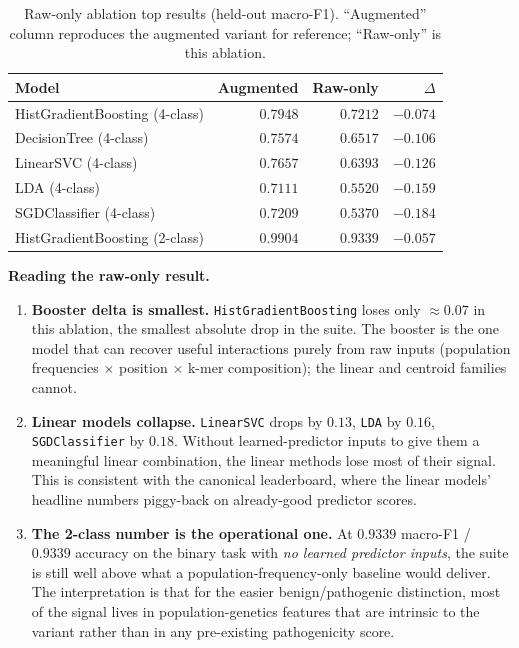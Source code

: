 \documentclass[11pt,a4paper]{article}
\begin{document}
\begin{table}[H]
\centering
\caption{Raw-only ablation top results (held-out macro-F1). ``Augmented''
column reproduces the augmented variant for reference; ``Raw-only'' is this
ablation.}
\label{tab:raw-only}
\small
\begin{tabular}{lrrr}
\toprule
Model & Augmented & Raw-only & $\Delta$ \\
\midrule
HistGradientBoosting (4-class) & $0.7948$ & $0.7212$ & $-0.074$ \\
DecisionTree (4-class) & $0.7574$ & $0.6517$ & $-0.106$ \\
LinearSVC (4-class) & $0.7657$ & $0.6393$ & $-0.126$ \\
LDA (4-class) & $0.7111$ & $0.5520$ & $-0.159$ \\
SGDClassifier (4-class) & $0.7209$ & $0.5370$ & $-0.184$ \\
\midrule
HistGradientBoosting (2-class) & $0.9904$ & $0.9339$ & $-0.057$ \\
\bottomrule
\end{tabular}
\end{table}

\textbf{Reading the raw-only result.}
\begin{enumerate}[leftmargin=*]
 \item \textbf{Booster delta is smallest.} \texttt{HistGradientBoosting}
 loses only $\approx 0.07$ in this ablation, the smallest absolute
 drop in the suite. The booster is the one model that can recover
 useful interactions purely from raw inputs (population frequencies
 $\times$ position $\times$ k-mer composition); the linear and
 centroid families cannot.
 \item \textbf{Linear models collapse.} \texttt{LinearSVC} drops by
 $0.13$, \texttt{LDA} by $0.16$, \texttt{SGDClassifier} by $0.18$.
 Without learned-predictor inputs to give them a meaningful linear
 combination, the linear methods lose most of their signal. This is
 consistent with the canonical leaderboard, where the linear models'
 headline numbers piggy-back on already-good predictor scores.
 \item \textbf{The 2-class number is the operational one.} At $0.9339$
 macro-F1 / $0.9339$ accuracy on the binary task with \emph{no
 learned predictor inputs}, the suite is still well above what a
 population-frequency-only baseline would deliver. The
 interpretation is that for the
 easier benign/pathogenic distinction, most of the signal lives in
 population-genetics features that are intrinsic to the variant
 rather than in any pre-existing pathogenicity score.
\end{enumerate}
\end{document}
